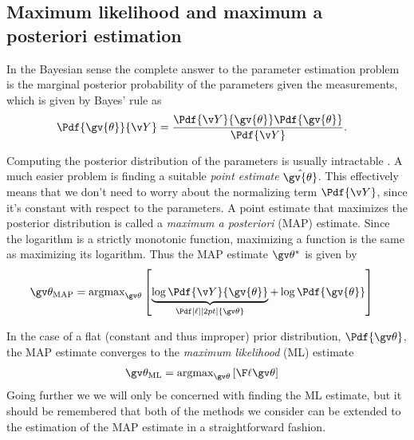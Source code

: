 \subsection{Maximum likelihood and maximum a posteriori estimation}%

In the Bayesian sense the complete answer to the parameter estimation
problem is the marginal posterior probability of the parameters
given the measurements, which is given by Bayes' rule as
\begin{align}
	\Pdf{\gv{\theta}}{\Y}&=\frac{\Pdf{\Y}{\gv{\theta}}\Pdf{\gv{\theta}}}{\Pdf{\Y}}.
	\label{eq:param_post}
\end{align}

Computing the posterior distribution of the parameters is usually intractable . A much
easier problem is finding a suitable \emph{point estimate} $\hat{\gv{\theta}}$.
This effectively means that we don't need to worry about the normalizing
term $\Pdf{\Y}$, since it's constant with respect to the parameters. 
A point estimate that maximizes the posterior distribution
is called a \emph{maximum a posteriori} (MAP) estimate. 
Since the logarithm is a strictly monotonic function, maximizing a function
is the same as maximizing its logarithm. Thus the MAP estimate $\Th^*$ is given by 
\begin{align}
	\Th_{\text{MAP}} &= \text{argmax}_{\Th}\left[\underbrace{\log \Pdf{\Y}{\gv{\theta}}}_{\Pdf[\ell][2pt]{\Th}} + \log\Pdf{\gv{\theta}}\right]
	\label{eq:MAP}
\end{align}

In the case of a flat (constant and thus improper)
prior distribution, $\Pdf{\Th}$, the MAP estimate converges to the
\emph{maximum likelihood} (ML) estimate
\begin{align}
	\Th_{\text{ML}} &= \text{argmax}_{\Th}\left[\lLH\right]
	\label{eq:ML}
\end{align}
Going further we we will only be concerned with finding the ML estimate, but it should
be remembered that both of the methods we consider can be extended
to the estimation of the MAP estimate in a straightforward fashion.


